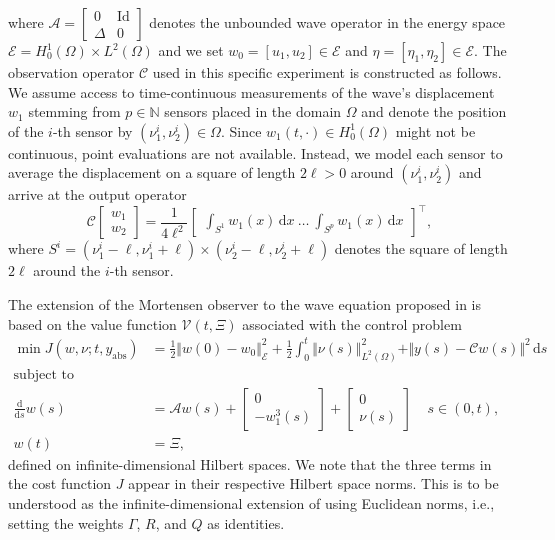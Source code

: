 \documentclass[11pt,reqno]{amsart}
\numberwithin{equation}{section}
\theoremstyle{plain}
\begin{document}
%
where $\mathcal{A} = \begin{bmatrix} 0 & \mathrm{Id} \\ \Delta & 0 \end{bmatrix}$ denotes the unbounded wave operator in the energy space $\mathcal{E} = H^1_0(\Omega) \times L^2(\Omega)$ and we set $w_0 = [u_1,u_2] \in \mathcal{E}$ and $\eta = [\eta_1,\eta_2] \in \mathcal{E}$.
The observation operator $\mathcal{C}$ used in this specific experiment is constructed as follows. 
We assume access to time-continuous measurements of the wave's displacement $w_1$ stemming from $p \in \mathbb{N}$ sensors placed in the domain $\Omega$ and denote the position of the $i$-th sensor by $(\nu_1^i,\nu_2^i) \in \Omega$. Since $w_1(t,\cdot) \in H^1_0(\Omega)$ might not be continuous, point evaluations are not available. Instead, we model each sensor to average the displacement on a square of length $2 \ell > 0$ around $(\nu_1^i,\nu_2^i)$ and arrive at the output operator 
%
\begin{equation*}
	\mathcal{C} \begin{bmatrix} w_1 \\ w_2 \end{bmatrix} 
	=
	\frac{1}{4\ell^2}
	\begin{bmatrix}
		\int_{S^1} 
		w_1(x) \, \mathrm{d} x 
		~\dots~
		\int_{S^p} 
		w_1(x) \, \mathrm{d} x
	\end{bmatrix}^\top,
\end{equation*}
%
where $S^i = (\nu_1^i - \ell,\nu_1^i + \ell) \times (\nu_2^i - \ell,\nu_2^i + \ell)$ denotes the square of length $2 \ell$ around the $i$-th sensor.

The extension of the Mortensen observer to the wave equation proposed in \cite{Sch24} is based on the value function $\mathcal{V}(t,\Xi)$ associated with the control problem
%
\begin{equation}\label{eq: OCPWaveNum}
	\begin{aligned}
		\min J(w,\nu;t,y_\mathrm{abs})
		&= \tfrac{1}{2} \Vert w(0) - w_0 \Vert_\mathcal{E}^2
		+ \tfrac{1}{2} \int_0^t \Vert \nu(s) \Vert_{L^2(\Omega)}^2
		+ \Vert y(s) - \mathcal{C} w(s) \Vert^2 \, \mathrm{d}s\\
		\text{subject to}~~~~~~~~~~&\\
		\frac{\mathrm{d}}{\mathrm{d}s} w(s)
		&=
		\mathcal{A}
		w(s)
		+
		\begin{bmatrix} 0 \\ - w_1^3(s) \end{bmatrix}
		+ \begin{bmatrix} 0 \\ \nu(s) \end{bmatrix}
		~~~~~ s \in (0,t),\\
		w(t)
		& = \Xi,
	\end{aligned}
\end{equation}
%
defined on infinite-dimensional Hilbert spaces. We note that the three terms in the cost function $J$ appear in their respective Hilbert space norms. This is to be understood as the infinite-dimensional extension of using Euclidean norms, i.e., setting the weights $\Gamma$, $R$, and $Q$ as identities.
\end{document}
